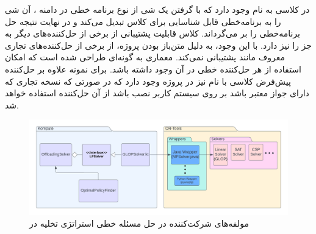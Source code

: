 در  کلاسی به نام  وجود دارد که با گرفتن یک شی از نوع برنامه خطی در دامنه ، آن شی را به برنامه‌خطی قابل شناسایی برای کلاس  تبدیل می‌کند و در نهایت نتیجه حل برنامه‌خطی را بر می‌گرداند. کلاس  قابلیت پشتیبانی از برخی از حل‌کننده‌های دیگر به جز  را نیز دارد. با این وجود، به دلیل متن‌باز بودن پروژه، از برخی از حل‌کننده‌های تجاری معروف مانند  پشتیبانی نمی‌کند. معماری  به گونه‌ای طراحی شده است که امکان استفاده از هر حل‌کننده‌ خطی در آن وجود داشته باشد. برای نمونه علاوه بر حل‌کننده پیش‌فرض  کلاسی با نام  نیز در پروژه وجود دارد که در صورتی که نسخه تجاری  که دارای جواز معتبر باشد بر روی سیستم کاربر نصب باشد از آن حل‌کننده استفاده خواهد شد.
\begin{figure}
	\centering
	\includegraphics[width=\textwidth]{figures/solverdiagram.png}
	\caption{مولفه‌های شرکت‌کننده در حل مسئله خطی استراتژی تخلیه در }
	\label{fig:solverdiagram}
\end{figure}
\newpage
